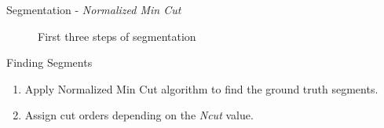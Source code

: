 \documentclass[10pt,xcolor=svgnames]{beamer} %
\begin{document}
\begin{frame}{Segmentation - \textit{Normalized Min Cut}}
\begin{figure}
    \caption{First three steps of segmentation}
    \label{fig:gridSegmentationExample}
    
\end{figure}
\end{frame}


\begin{frame}{Finding Segments}
\begin{enumerate}
    \item Apply Normalized Min Cut algorithm to find the ground truth segments.
    \item Assign cut orders depending on the \textit{Ncut} value.
\end{enumerate}
\end{frame}
\end{document}
